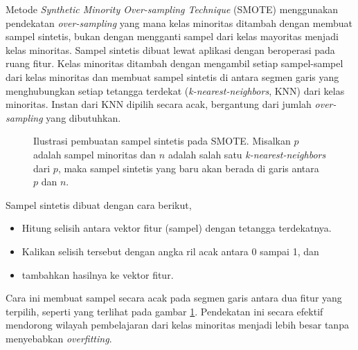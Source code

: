 Metode \textit{Synthetic Minority Over-sampling Technique} (SMOTE)
\parencite{chawla2002smote} menggunakan pendekatan \textit{over-sampling} yang mana
kelas minoritas ditambah dengan membuat sampel sintetis, bukan dengan
mengganti sampel dari kelas mayoritas menjadi kelas minoritas.
Sampel sintetis dibuat lewat aplikasi dengan beroperasi pada
ruang fitur.
Kelas minoritas ditambah dengan mengambil setiap sampel-sampel dari kelas
minoritas dan membuat sampel sintetis di antara segmen garis yang menghubungkan
setiap tetangga terdekat (\textit{k-nearest-neighbors}, KNN) dari kelas
minoritas.
Instan dari KNN dipilih secara acak, bergantung dari jumlah
\textit{over-sampling} yang dibutuhkan.

\begin{figure}[htbp]
\centering
\setlength\fboxsep{4pt}
	\caption{
	Ilustrasi pembuatan sampel sintetis pada SMOTE.
	Misalkan $p$ adalah sampel minoritas dan $n$ adalah salah satu
	\textit{k-nearest-neighbors} dari $p$, maka
	sampel sintetis yang baru akan berada di garis antara $p$ dan $n$.
	}
	\label{fig:smote}
\end{figure}

Sampel sintetis dibuat dengan cara berikut,
\begin{itemize}
	\item Hitung selisih antara vektor fitur (sampel) dengan tetangga
	terdekatnya.
	\item Kalikan selisih tersebut dengan angka ril acak antara 0 sampai 1,
	dan
	\item tambahkan hasilnya ke vektor fitur.
\end{itemize}

Cara ini membuat sampel secara acak pada segmen garis antara dua fitur yang
terpilih, seperti yang terlihat pada gambar \ref{fig:smote}.
Pendekatan ini secara efektif mendorong wilayah pembelajaran dari kelas
minoritas menjadi lebih besar tanpa menyebabkan \textit{overfitting}.
